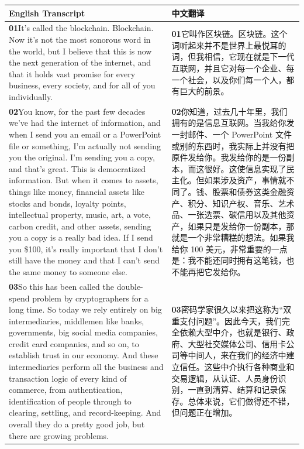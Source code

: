 \documentclass[UTF8,zihao=-4,fontset=fandol]{ctexart}
\newcommand{\TranscriptColumn}{\raggedright\arraybackslash\hyphenpenalty=10000\exhyphenpenalty=10000\sloppy}
\begin{document}
\renewcommand{\arraystretch}{1.23}
\begin{longtable}{>{\TranscriptColumn}p{} >{\TranscriptColumn}p{}}
\rowcolor{headerBg}\textbf{English Transcript} & \textbf{中文翻译} \\ \hline
\textbf{01}\quad It's called the blockchain. Blockchain. Now it's not the most sonorous word in the world, but I believe that this is now the next generation of the internet, and that it holds vast promise for every business, every society, and for all of you individually. & \textbf{01}\quad 它叫作区块链。区块链。这个词听起来并不是世界上最悦耳的词，但我相信，它现在就是下一代互联网，并且它对每一个企业、每一个社会，以及你们每一个人，都有巨大的前景。 \\ \hline
\textbf{02}\quad You know, for the past few decades we've had the internet of information, and when I send you an email or a PowerPoint file or something, I'm actually not sending you the original. I'm sending you a copy, and that's great. This is democratized information. But when it comes to assets, things like money, financial assets like stocks and bonds, loyalty points, intellectual property, music, art, a vote, carbon credit, and other assets, sending you a copy is a really bad idea. If I send you \$100, it's really important that I don't still have the money and that I can't send the same money to someone else. & \textbf{02}\quad 你知道，过去几十年里，我们拥有的是信息互联网。当我给你发一封邮件、一个 PowerPoint 文件或别的东西时，我实际上并没有把原件发给你。我发给你的是一份副本，而这很好。这使信息实现了民主化。但如果涉及资产，事情就不同了。钱、股票和债券这类金融资产、积分、知识产权、音乐、艺术品、一张选票、碳信用以及其他资产，如果只是发给你一份副本，那就是一个非常糟糕的想法。如果我给你 100 美元，非常重要的一点是：我不能还同时拥有这笔钱，也不能再把它发给你。 \\ \hline
\textbf{03}\quad So this has been called the double-spend problem by cryptographers for a long time. So today we rely entirely on big intermediaries, middlemen like banks, governments, big social media companies, credit card companies, and so on, to establish trust in our economy. And these intermediaries perform all the business and transaction logic of every kind of commerce, from authentication, identification of people through to clearing, settling, and record-keeping. And overall they do a pretty good job, but there are growing problems. & \textbf{03}\quad 密码学家很久以来把这称为“双重支付问题”。因此今天，我们完全依赖大型中介，也就是银行、政府、大型社交媒体公司、信用卡公司等中间人，来在我们的经济中建立信任。这些中介执行各种商业和交易逻辑，从认证、人员身份识别，一直到清算、结算和记录保存。总体来说，它们做得还不错，但问题正在增加。 \\ \hline

\end{longtable}
\end{document}
